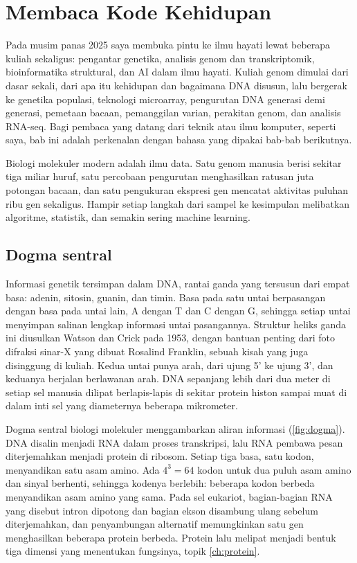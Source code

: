 \chapter{Membaca Kode Kehidupan}
\label{ch:genomik}

Pada musim panas 2025 saya membuka pintu ke ilmu hayati lewat beberapa kuliah sekaligus: pengantar genetika,
analisis genom dan transkriptomik, bioinformatika struktural, dan AI dalam ilmu hayati. Kuliah genom dimulai
dari dasar sekali, dari apa itu kehidupan dan bagaimana DNA disusun, lalu bergerak ke genetika populasi,
teknologi microarray, pengurutan DNA generasi demi generasi, pemetaan bacaan, pemanggilan varian, perakitan
genom, dan analisis RNA-seq. Bagi pembaca yang datang dari teknik atau ilmu komputer, seperti saya, bab ini
adalah perkenalan dengan bahasa yang dipakai bab-bab berikutnya.

Biologi molekuler modern adalah ilmu data. Satu genom manusia berisi sekitar tiga miliar huruf, satu percobaan
pengurutan menghasilkan ratusan juta potongan bacaan, dan satu pengukuran ekspresi gen mencatat aktivitas
puluhan ribu gen sekaligus. Hampir setiap langkah dari sampel ke kesimpulan melibatkan algoritme, statistik,
dan semakin sering machine learning.

\section{Dogma sentral}

Informasi genetik tersimpan dalam DNA, rantai ganda yang tersusun dari empat basa: adenin, sitosin, guanin, dan
timin. Basa pada satu untai berpasangan dengan basa pada untai lain, A dengan T dan C dengan G, sehingga setiap
untai menyimpan salinan lengkap informasi untai pasangannya. Struktur heliks ganda ini diusulkan Watson dan Crick
pada 1953, dengan bantuan penting dari foto difraksi sinar-X yang dibuat Rosalind Franklin, sebuah kisah yang juga
disinggung di kuliah. Kedua untai punya arah, dari ujung 5' ke ujung 3', dan keduanya berjalan berlawanan arah.
DNA sepanjang lebih dari dua meter di setiap sel manusia dilipat berlapis-lapis di sekitar protein histon sampai
muat di dalam inti sel yang diameternya beberapa mikrometer.

Dogma sentral biologi molekuler menggambarkan aliran informasi (\cref{fig:dogma}). DNA disalin menjadi RNA dalam
proses transkripsi, lalu RNA pembawa pesan diterjemahkan menjadi protein di ribosom. Setiap tiga basa, satu kodon,
menyandikan satu asam amino. Ada $4^3=64$ kodon untuk dua puluh asam amino dan sinyal berhenti, sehingga kodenya
berlebih: beberapa kodon berbeda menyandikan asam amino yang sama. Pada sel eukariot, bagian-bagian RNA yang disebut
intron dipotong dan bagian ekson disambung ulang sebelum diterjemahkan, dan penyambungan alternatif memungkinkan
satu gen menghasilkan beberapa protein berbeda. Protein lalu melipat menjadi bentuk tiga dimensi yang menentukan
fungsinya, topik \cref{ch:protein}.


